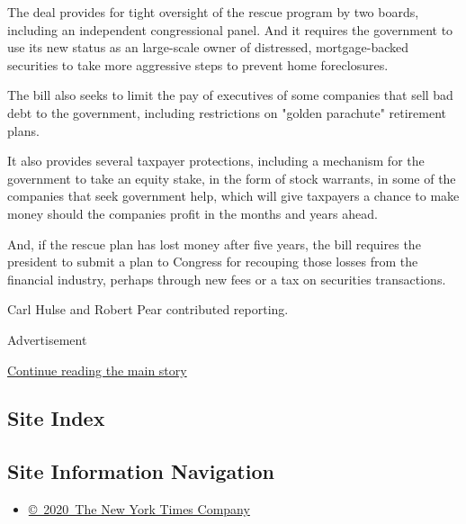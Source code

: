 The deal provides for tight oversight of the rescue program by two
boards, including an independent congressional panel. And it requires
the government to use its new status as an large-scale owner of
distressed, mortgage-backed securities to take more aggressive steps to
prevent home foreclosures.

The bill also seeks to limit the pay of executives of some companies
that sell bad debt to the government, including restrictions on "golden
parachute" retirement plans.

It also provides several taxpayer protections, including a mechanism for
the government to take an equity stake, in the form of stock warrants,
in some of the companies that seek government help, which will give
taxpayers a chance to make money should the companies profit in the
months and years ahead.

And, if the rescue plan has lost money after five years, the bill
requires the president to submit a plan to Congress for recouping those
losses from the financial industry, perhaps through new fees or a tax on
securities transactions.

Carl Hulse and Robert Pear contributed reporting.

Advertisement

\protect\hyperlink{after-bottom}{Continue reading the main story}

\hypertarget{site-index}{%
\subsection{Site Index}\label{site-index}}

\hypertarget{site-information-navigation}{%
\subsection{Site Information
Navigation}\label{site-information-navigation}}

\begin{itemize}
\tightlist
\item
  \href{https://help.nytimes3xbfgragh.onion/hc/en-us/articles/115014792127-Copyright-notice}{©~2020~The
  New York Times Company}
\end{itemize}

